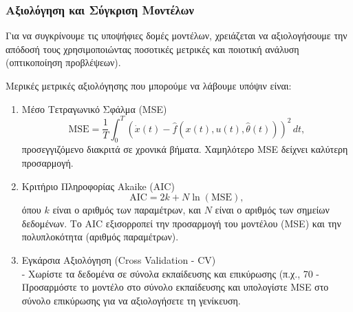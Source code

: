 \documentclass[12pt]{article} %
\numberwithin{equation}{section}  %
\begin{document}
\subsubsection{Αξιολόγηση και Σύγκριση Μοντέλων}
Για να συγκρίνουμε τις υποψήφιες δομές μοντέλων, χρειάζεται να αξιολογήσουμε την απόδοσή τους χρησιμοποιώντας ποσοτικές μετρικές και ποιοτική ανάλυση (οπτικοποίηση προβλέψεων).

Μερικές μετρικές αξιολόγησης που μπορούμε να λάβουμε υπόψιν είναι:
\begin{enumerate}
    \item Μέσο Τετραγωνικό Σφάλμα (MSE) \\
        \[
        \text{MSE} = \frac{1}{T} \int_0^T (\dot{x}(t) - \hat{f}(x(t), u(t), \hat{\theta}(t)))^2 \, dt,
        \]
        προσεγγιζόμενο διακριτά σε χρονικά βήματα. Χαμηλότερο MSE δείχνει καλύτερη προσαρμογή.
    
    \item Κριτήριο Πληροφορίας Akaike (AIC) \\
        \[
        \text{AIC} = 2k + N \ln(\text{MSE}),
        \]
        όπου \(k\) είναι ο αριθμός των παραμέτρων, και \(N\) είναι ο αριθμός των σημείων δεδομένων. Το AIC εξισορροπεί την προσαρμογή του μοντέλου (MSE) και την πολυπλοκότητα (αριθμός παραμέτρων).
        
    \item Εγκάρσια Αξιολόγηση (Cross Validation - CV) \\
       - Χωρίστε τα δεδομένα σε σύνολα εκπαίδευσης και επικύρωσης (π.χ., 70%
   - Προσαρμόστε το μοντέλο στο σύνολο εκπαίδευσης και υπολογίστε MSE στο σύνολο επικύρωσης για να αξιολογήσετε τη γενίκευση.
\end{enumerate}



\newpage
\end{document}
